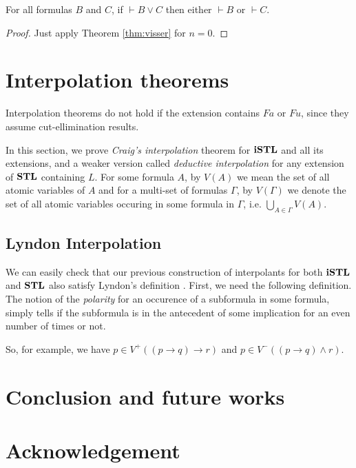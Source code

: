 \documentclass[12pt,a4paper]{article}
\begin{document}


\begin{cor}
	For all formulas $B$ and $C$, if $\vdash B \vee C$ then either $\vdash B$ or $\vdash C$.
\end{cor}
\begin{proof}
	Just apply Theorem \ref{thm:visser} for $n = 0$.
\end{proof}

\section{Interpolation theorems}
{\color{red} Interpolation theorems do not hold if the extension contains $Fa$ or $Fu$, since they assume cut-ellimination results.}

In this section, we prove \emph{Craig's interpolation} theorem for $\mathbf{iSTL}$ and all its extensions, and a weaker version called \emph{deductive interpolation} for any extension of $\mathbf{STL}$ containing $L$. For some formula $A$, by $V(A)$ we mean the set of all atomic variables of $A$ and for a multi-set of formulas $\Gamma$, by $V(\Gamma)$ we denote the set of all atomic variables occuring in some formula in $\Gamma$, i.e. $\bigcup_{A \in \Gamma} V(A)$.





\subsection{Lyndon Interpolation}

We can easily check that our previous construction of interpolants for both $\mathbf{iSTL}$ and $\mathbf{STL}$ also satisfy Lyndon's definition \cite{Lyndon1959AnIT}. First, we need the following definition. The notion of the \emph{polarity} for an occurence of a subformula in some formula, simply tells if the subformula is in the antecedent of some implication for an even number of times or not.



So, for example, we have $p \in V^+((p \rightarrow q) \rightarrow r)$ and $p \in V^-((p \rightarrow q) \wedge r)$.



\section{Conclusion and future works}

\section{Acknowledgement}



\end{document}
